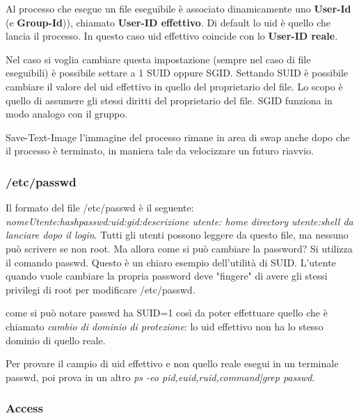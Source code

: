 \documentclass{article}
\begin{document}
\noindent Al processo che esegue un file eseguibile è associato dinamicamente uno \textbf{User-Id} (e \textbf{Group-Id})),
chiamato \textbf{User-ID effettivo}. Di default lo uid è quello che lancia il processo. In questo caso uid effettivo
coincide con lo \textbf{User-ID reale}.

\noindent Nel caso si voglia cambiare questa impostazione (sempre nel caso di file eseguibili) è possibile settare
a 1 SUID oppure SGID. 
Settando SUID è possibile cambiare il valore del uid effettivo in quello del proprietario del file. Lo scopo è quello di 
assumere gli stessi diritti del proprietario del file. SGID funziona in modo analogo con il gruppo. 

\noindent Save-Text-Image l'immagine del processo rimane in area di swap anche dopo che il processo è
terminato, in maniera tale da velocizzare un futuro riavvio.

\subsubsection{/etc/passwd}
Il formato del file /etc/passwd è il seguente: \textit{nomeUtente:hashpasswd:uid:gid:descrizione
utente: home directory utente:shell da lanciare dopo il login}.
Tutti gli utenti possono leggere da questo file, ma nessuno può scrivere se non root. 
Ma allora come si può cambiare la password? Si utilizza il comando passwd. Questo è un chiaro esempio dell'utilità di SUID.
L'utente quando vuole cambiare la propria password deve "fingere" di avere gli stessi privilegi di root per modificare /etc/passwd.
\medskip

 come si può notare passwd ha SUID=1 così da poter
effettuare quello che è chiamato \textit{cambio di dominio di protezione}: lo uid effettivo non ha lo stesso dominio di quello reale.

\noindent Per provare il campio di uid effettivo e non quello reale esegui in un terminale passwd, poi prova in un altro 
\textit{ps -eo pid,euid,ruid,command|grep passwd}.

\subsubsection{Access}

\noindent {} 
\medskip
\end{document}
